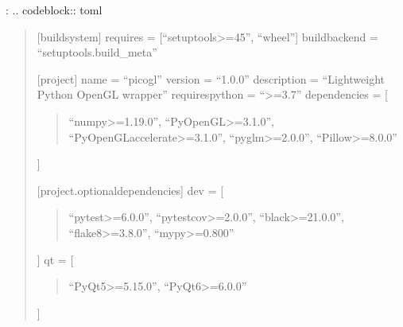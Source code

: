 \documentclass[a4paper,10pt,english,openany,oneside]{sphinxmanual}
\begin{document}
\sphinxAtStartPar
{}:
.. code\sphinxhyphen{}block:: toml
\begin{quote}

\sphinxAtStartPar
{[}build\sphinxhyphen{}system{]}
requires = {[}“setuptools\textgreater{}=45”, “wheel”{]}
build\sphinxhyphen{}backend = “setuptools.build\_meta”

\sphinxAtStartPar
{[}project{]}
name = “picogl”
version = “1.0.0”
description = “Lightweight Python OpenGL wrapper”
requires\sphinxhyphen{}python = “\textgreater{}=3.7”
dependencies = {[}
\begin{quote}

\sphinxAtStartPar
“numpy\textgreater{}=1.19.0”,
“PyOpenGL\textgreater{}=3.1.0”,
“PyOpenGL\sphinxhyphen{}accelerate\textgreater{}=3.1.0”,
“pyglm\textgreater{}=2.0.0”,
“Pillow\textgreater{}=8.0.0”
\end{quote}

\sphinxAtStartPar
{]}

\sphinxAtStartPar
{[}project.optional\sphinxhyphen{}dependencies{]}
dev = {[}
\begin{quote}

\sphinxAtStartPar
“pytest\textgreater{}=6.0.0”,
“pytest\sphinxhyphen{}cov\textgreater{}=2.0.0”,
“black\textgreater{}=21.0.0”,
“flake8\textgreater{}=3.8.0”,
“mypy\textgreater{}=0.800”
\end{quote}

\sphinxAtStartPar
{]}
qt = {[}
\begin{quote}

\sphinxAtStartPar
“PyQt5\textgreater{}=5.15.0”,
“PyQt6\textgreater{}=6.0.0”
\end{quote}

\sphinxAtStartPar
{]}
\end{quote}
\end{document}
